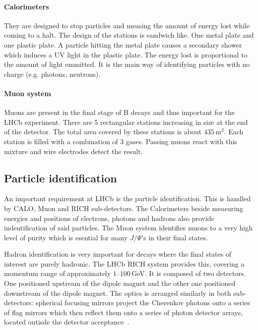 \documentclass[11pt,twoside]{scrreprt}
\begin{document}
\paragraph{Calorimeters} They are designed to stop particles and measing the amount of energy lost while coming to a halt. The design of the stations is sandwich like. One metal plate and one plastic plate. A particle hitting the metal plate causes a secondary shower which induces a UV light in the plastic plate. The energy lost is proportional to the amount of light emmitted. It is the main way of identifying particles with no charge (e.g. photons, neutrons).

\paragraph{Muon system}
Muons are present in the final stage of B decays and thus important for the LHCb experiment. There are 5 rectangular stations increasing in size at the end of the detector. The total area covered by these stations is about $435$\,m$^2$. Each station is filled with a combination of 3 gases. Passing muons react with this mixture and wire electrodes detect the result.


\subsection{Particle identification} %
\label{sub:particle_identification}
An important requirement at LHCb is the particle identification. This is handled by CALO, Muon and RICH sub-detectors. The Calorimeters beside measuring energies and positions of electrons, photons and hadrons also provide indentification of said particles. The Muon system identifies muons to a very high level of purity which is esential for many \(J/\Psi\)'s in their final states.

Hadron identification is very important for decays where the final states of interest are purely hadronic. The LHCb RICH system provides this, covering a momentum range of approximately $1$--$100$\,GeV. It is composed of two detectors. One positioned upstream of the dipole magnet and the other one positioned downstream of the dipole magnet. The optics is arranged similarly in both sub-detectors: spherical focusing mirrors project the Cherenkov photons onto a series of flag mirrors which then reflect them onto a series of photon detector arrays, located outisde the detector acceptance~\cite{Powell:2011}.
\end{document}
